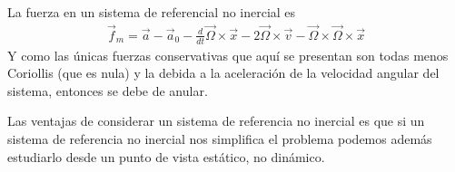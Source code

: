 \documentclass[a4paper]{article}
\begin{document}
La fuerza en un sistema de referencial no inercial es 
\begin{align*}
\vec{f}_m = \vec{a} - \vec{a}_0 - \frac{d}{dt} \vec{\Omega} \times \vec{x} - 2 \vec{\Omega} \times \vec{v} - \vec{\Omega} \times \vec{\Omega} \times \vec{x}
\end{align*}
Y como las únicas fuerzas conservativas que aquí se presentan son todas
menos Coriollis (que es nula) y la debida a la aceleración de la velocidad angular
del sistema, entonces se debe de anular.

Las ventajas de considerar un sistema de referencia no inercial es que
si un sistema de referencia no inercial nos simplifica el problema
podemos además estudiarlo desde un punto de vista estático, no
dinámico.
\end{document}
